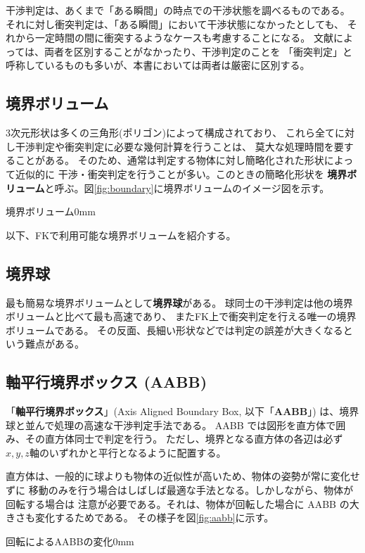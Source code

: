 干渉判定は、あくまで「ある瞬間」の時点での干渉状態を調べるものである。
それに対し衝突判定は、「ある瞬間」において干渉状態になかったとしても、
それから一定時間の間に衝突するようなケースも考慮することになる。
文献によっては、両者を区別することがなかったり、干渉判定のことを
「衝突判定」と呼称しているものも多いが、本書においては両者は厳密に区別する。

\subsection{境界ボリューム}
3次元形状は多くの三角形(ポリゴン)によって構成されており、
これら全てに対し干渉判定や衝突判定に必要な幾何計算を行うことは、
莫大な処理時間を要することがある。
そのため、通常は判定する物体に対し簡略化された形状によって近似的に
干渉・衝突判定を行うことが多い。このときの簡略化形状を
\textbf{境界ボリューム}と呼ぶ。図\ref{fig:boundary}に境界ボリュームのイメージ図を示す。

	{境界ボリューム}{0mm}

以下、FKで利用可能な境界ボリュームを紹介する。

\subsection{境界球}
最も簡易な境界ボリュームとして\textbf{境界球}がある。
球同士の干渉判定は他の境界ボリュームと比べて最も高速であり、
またFK上で衝突判定を行える唯一の境界ボリュームである。
その反面、長細い形状などでは判定の誤差が大きくなるという難点がある。

\subsection{軸平行境界ボックス (AABB)}
「\textbf{軸平行境界ボックス}」(Axis Aligned Boundary Box, 以下「\textbf{AABB}」)
は、境界球と並んで処理の高速な干渉判定手法である。
AABB では図形を直方体で囲み、その直方体同士で判定を行う。
ただし、境界となる直方体の各辺は必ず \(x,y,z軸\)のいずれかと平行となるように配置する。

直方体は、一般的に球よりも物体の近似性が高いため、物体の姿勢が常に変化せずに
移動のみを行う場合はしばしば最適な手法となる。しかしながら、物体が回転する場合は
注意が必要である。それは、物体が回転した場合に AABB の大きさも変化するためである。
その様子を図\ref{fig:aabb}に示す。

	{回転によるAABBの変化}{0mm}

